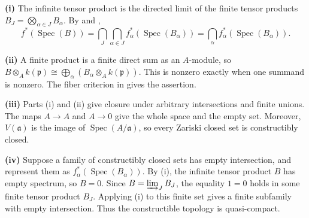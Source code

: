 \textbf{(i)} The infinite tensor product is the directed limit of the finite tensor products $B_J=\bigotimes_{\alpha\in J}B_\alpha$. By  and ,
\[f^*(\operatorname{Spec}(B))=\bigcap_J\bigcap_{\alpha\in J}f_\alpha^*(\operatorname{Spec}(B_\alpha))=\bigcap_\alpha f_\alpha^*(\operatorname{Spec}(B_\alpha)).\]

\textbf{(ii)} A finite product is a finite direct sum as an $A$-module, so $B\otimes_A k(\mathfrak p)\cong\bigoplus_\alpha(B_\alpha\otimes_A k(\mathfrak p))$. This is nonzero exactly when one summand is nonzero. The fiber criterion in  gives the assertion.

\textbf{(iii)} Parts (i) and (ii) give closure under arbitrary intersections and finite unions. The maps $A\to A$ and $A\to0$ give the whole space and the empty set. Moreover, $V(\mathfrak a)$ is the image of $\operatorname{Spec}(A/\mathfrak a)$, so every Zariski closed set is constructibly closed.

\textbf{(iv)} Suppose a family of constructibly closed sets has empty intersection, and represent them as $f_\alpha^*(\operatorname{Spec}(B_\alpha))$. By (i), the infinite tensor product $B$ has empty spectrum, so $B=0$. Since $B=\varinjlim_J B_J$, the equality $1=0$ holds in some finite tensor product $B_J$. Applying (i) to this finite set gives a finite subfamily with empty intersection. Thus the constructible topology is quasi-compact.
